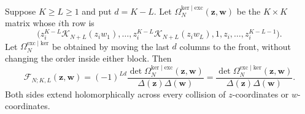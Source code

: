 \begin{theorem}
\label{thm:GMS-audit-AV}
Suppose $K\geq L\geq1$ and put $d=K-L$.  Let
$\Omega_N^{\mathrm{ker}\mid\mathrm{exc}}(\mathbf z,\mathbf w)$ be the $K\times K$ matrix
whose $i$th row is
\begin{equation}
 \bigl(
 z_i^{K-L}\mathcal K_{N+L}(z_iw_1),\ldots,
 z_i^{K-L}\mathcal K_{N+L}(z_iw_L),
 1,z_i,\ldots,z_i^{K-L-1}
 \bigr).
 \label{eq:GMS-audit-OmegaN-row}
\end{equation}
Let $\Omega_N^{\mathrm{exc}\mid\mathrm{ker}}$ be obtained by moving the last $d$ columns to
the front, without changing the order inside either block.  Then
\begin{equation}
 \mathcal F_{N;K,L}(\mathbf z,\mathbf w)
 =(-1)^{Ld}\frac{\det\Omega_N^{\mathrm{ker}\mid\mathrm{exc}}(\mathbf z,\mathbf w)}
 {\Delta(\mathbf z)\Delta(\mathbf w)}
 =\frac{\det\Omega_N^{\mathrm{exc}\mid\mathrm{ker}}(\mathbf z,\mathbf w)}
 {\Delta(\mathbf z)\Delta(\mathbf w)}.
 \label{eq:GMS-audit-AV}
\end{equation}
Both sides extend holomorphically across every collision of $z$-coordinates or
$w$-coordinates.
\end{theorem}

